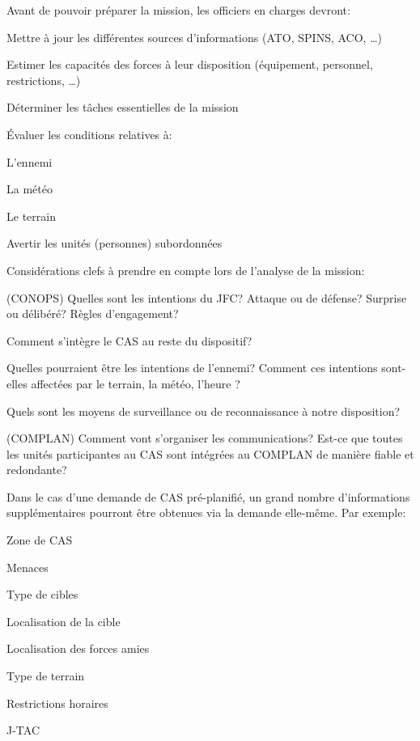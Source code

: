 \e
    \item Avant de pouvoir préparer la mission, les officiers en charges devront:
    \ee
        \item Mettre à jour les différentes sources d’informations (ATO, SPINS, ACO, …)
        \item Estimer les capacités des forces à leur disposition (équipement, personnel, restrictions, …)
        \item Déterminer les tâches essentielles de la mission
        \item Évaluer les conditions relatives à:
        \eee
            \item L’ennemi
            \item La météo
            \item Le terrain
        \ed
        \item Avertir les unités (personnes) subordonnées
    \ed
    \item Considérations clefs à prendre en compte lors de l’analyse de la mission:
    \ee
        \item (CONOPS) Quelles sont les intentions du JFC? Attaque ou de défense? Surprise ou délibéré? Règles d’engagement?
        \item Comment s’intègre le CAS au reste du dispositif?
        \item Quelles pourraient être les intentions de l’ennemi? Comment ces intentions sont-elles affectées par le terrain, la météo, l’heure ?
        \item Quels sont les moyens de surveillance ou de reconnaissance à notre disposition?
        \item (COMPLAN) Comment vont s’organiser les communications? Est-ce que toutes les unités participantes au CAS sont intégrées au COMPLAN  de manière fiable et redondante?
    \ed
    \item Dans le cas d’une demande de CAS pré-planifié, un grand nombre d’informations supplémentaires pourront être obtenues via la demande elle-même. Par exemple:
    \ee
        \item Zone de CAS
        \item Menaces
        \item Type de cibles
        \item Localisation de la cible
        \item Localisation des forces amies
        \item Type de terrain
        \item Restrictions horaires
        \item J-TAC
    \ed
\ed

